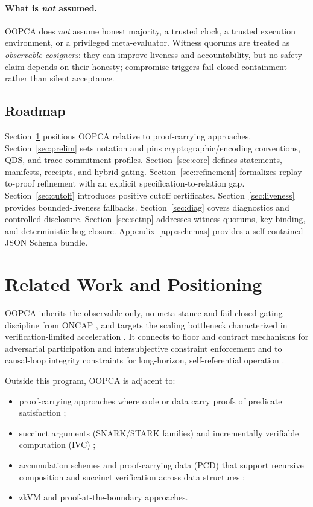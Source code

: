\documentclass[11pt]{article}
\begin{document}
\paragraph{What is \emph{not} assumed.}
OOPCA does \emph{not} assume honest majority, a trusted clock, a trusted execution environment, or a privileged meta-evaluator.
Witness quorums are treated as \emph{observable cosigners}: they can improve liveness and accountability, but no safety claim depends on their honesty; compromise triggers fail-closed containment rather than silent acceptance.

\subsection{Roadmap}

Section~\ref{sec:related} positions OOPCA relative to proof-carrying approaches. Section~\ref{sec:prelim} sets notation and pins cryptographic/encoding conventions, QDS, and trace commitment profiles. Section~\ref{sec:core} defines statements, manifests, receipts, and hybrid gating. Section~\ref{sec:refinement} formalizes replay-to-proof refinement with an explicit specification-to-relation gap. Section~\ref{sec:cutoff} introduces positive cutoff certificates. Section~\ref{sec:liveness} provides bounded-liveness fallbacks. Section~\ref{sec:diag} covers diagnostics and controlled disclosure. Section~\ref{sec:setup} addresses witness quorums, key binding, and deterministic bug closure. Appendix~\ref{app:schemas} provides a self-contained JSON Schema bundle.

\section{Related Work and Positioning}\label{sec:related}

OOPCA inherits the observable-only, no-meta stance and fail-closed gating discipline from ONCAP \cite{Takahashi2026ONCAP}, and targets the scaling bottleneck characterized in verification-limited acceleration \cite{Takahashi2026VLIA}. It connects to floor and contract mechanisms for adversarial participation and intersubjective constraint enforcement \cite{Takahashi2025FSNA,Takahashi2025FMIC} and to causal-loop integrity constraints for long-horizon, self-referential operation \cite{Takahashi2025CLI}.

Outside this program, OOPCA is adjacent to:
\begin{itemize}[leftmargin=1.2em]
  \item proof-carrying approaches where code or data carry proofs of predicate satisfaction \cite{Necula1997PCC};
  \item succinct arguments (SNARK/STARK families) and incrementally verifiable computation (IVC) \cite{BenSasson2014SNARK,Groth2016,BenSasson2018STARK,Setty2021Nova};
  \item accumulation schemes and proof-carrying data (PCD) that support recursive composition and succinct verification across data structures \cite{Bunz2020PCD};
  \item zkVM and proof-at-the-boundary approaches.
\end{itemize}
\end{document}
